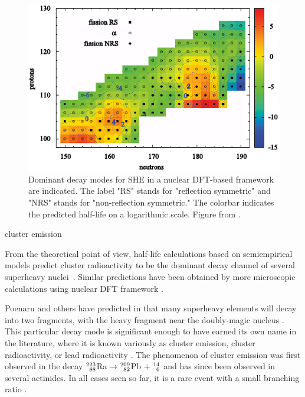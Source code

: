 \begin{figure}
	\centering
	\includegraphics[width=0.7\linewidth]{TeX_files/294Og_Warda2012_SHE}
	\caption[Dominant decay modes for SHE in a nuclear DFT-based framework.]{Dominant decay modes for SHE in a nuclear DFT-based framework are indicated. The label "RS" stands for "reflection symmetric" and "NRS" stands for "non-reflection symmetric." The colorbar indicates the predicted half-life on a logarithmic scale. Figure from \cite{Warda2012}.}
	\label{fig:warda2012she}
\end{figure}

cluster emission \cite{Sandulescu1980,Poenaru1986,Royer1998}

From the theoretical point of view, half-life calculations based on semiempirical models predict cluster radioactivity to be the dominant decay channel of several superheavy nuclei~\cite{Poenaru2011, Poenaru2012, Poenaru2013, Poenaru2015, Poenaru2018,Santhosh2018, Zhang2018}. Similar predictions have been obtained by more microscopic calculations using nuclear DFT framework \cite{Warda2011,Warda2018}.

Poenaru and others have predicted in \cite{Poenaru2011, Poenaru2012, Poenaru2013, Poenaru2015, Poenaru2018,Santhosh2018, Zhang2018} that many superheavy elements will decay into two fragments, with the heavy fragment near the doubly-magic nucleus {\Pb}. This particular decay mode is significant enough to have earned its own name in the literature, where it is known variously as cluster emission, cluster radioactivity, or lead radioactivity \cite{Sandulescu1980,Poenaru1986,Royer1998,Poenaru2010}. The phenomenon of cluster emission was first observed in the decay  $^{223}_{\hphantom{2}88}$Ra$\rightarrow$$^{209}_{\hphantom{2}82}$Pb + $^{14}_{\hphantom{1}6}$ \cite{Rose1983} and has since been observed in several actinides. In all cases seen so far, it is a rare event with a small branching ratio \cite{Poenaru2010}.


